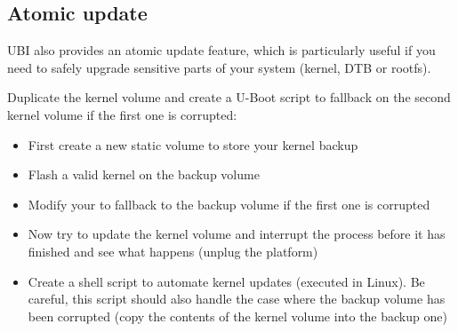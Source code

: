 \subsection{Atomic update}

UBI also provides an atomic update feature, which is particularly useful
if you need to safely upgrade sensitive parts of your system (kernel,
DTB or rootfs).

Duplicate the kernel volume and create a U-Boot script to fallback on
the second kernel volume if the first one is corrupted:
\begin{itemize}
  \item First create a new static volume to store your kernel backup
  \item Flash a valid kernel on the backup volume
  \item Modify your  to fallback to the backup volume if the first one
    is corrupted
  \item Now try to update the kernel volume and interrupt the process before
    it has finished and see what happens (unplug the platform)
  \item Create a shell script to automate kernel updates (executed in Linux).
    Be careful, this script should also handle the case where the backup
    volume has been corrupted (copy the contents of the kernel volume into
    the backup one)
\end{itemize}

